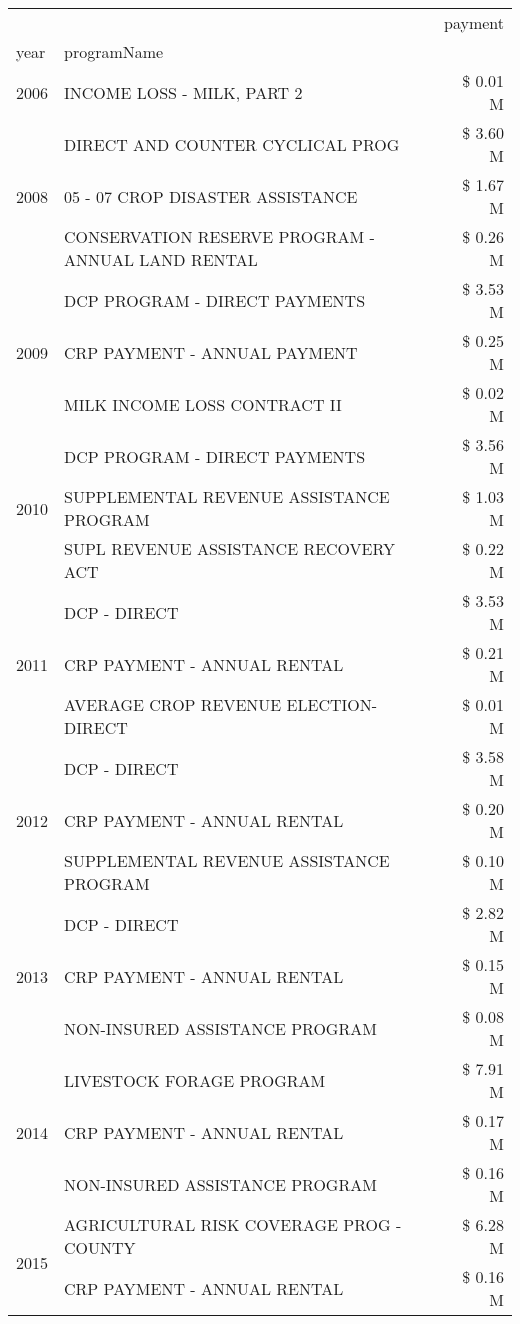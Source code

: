 \begin{tabular}{llr}
\toprule
 &  & payment \\
year & programName &  \\
\midrule
2006 & INCOME LOSS - MILK, PART 2 & \$ 0.01 M \\
\cline{1-3}
\multirow[t]{3}{*}{2008} & DIRECT AND COUNTER CYCLICAL PROG & \$ 3.60 M \\
 & 05 - 07 CROP DISASTER ASSISTANCE & \$ 1.67 M \\
 & CONSERVATION RESERVE PROGRAM - ANNUAL LAND RENTAL & \$ 0.26 M \\
\cline{1-3}
\multirow[t]{3}{*}{2009} & DCP PROGRAM - DIRECT PAYMENTS & \$ 3.53 M \\
 & CRP PAYMENT - ANNUAL PAYMENT & \$ 0.25 M \\
 & MILK INCOME LOSS CONTRACT II & \$ 0.02 M \\
\cline{1-3}
\multirow[t]{3}{*}{2010} & DCP PROGRAM - DIRECT PAYMENTS & \$ 3.56 M \\
 & SUPPLEMENTAL REVENUE ASSISTANCE PROGRAM & \$ 1.03 M \\
 & SUPL REVENUE ASSISTANCE RECOVERY ACT & \$ 0.22 M \\
\cline{1-3}
\multirow[t]{3}{*}{2011} & DCP - DIRECT & \$ 3.53 M \\
 & CRP PAYMENT - ANNUAL RENTAL & \$ 0.21 M \\
 & AVERAGE CROP REVENUE ELECTION-DIRECT & \$ 0.01 M \\
\cline{1-3}
\multirow[t]{3}{*}{2012} & DCP - DIRECT & \$ 3.58 M \\
 & CRP PAYMENT - ANNUAL RENTAL & \$ 0.20 M \\
 & SUPPLEMENTAL REVENUE ASSISTANCE PROGRAM & \$ 0.10 M \\
\cline{1-3}
\multirow[t]{3}{*}{2013} & DCP - DIRECT & \$ 2.82 M \\
 & CRP PAYMENT - ANNUAL RENTAL & \$ 0.15 M \\
 & NON-INSURED ASSISTANCE PROGRAM & \$ 0.08 M \\
\cline{1-3}
\multirow[t]{3}{*}{2014} & LIVESTOCK FORAGE PROGRAM & \$ 7.91 M \\
 & CRP PAYMENT - ANNUAL RENTAL & \$ 0.17 M \\
 & NON-INSURED ASSISTANCE PROGRAM & \$ 0.16 M \\
\cline{1-3}
\multirow[t]{3}{*}{2015} & AGRICULTURAL RISK COVERAGE PROG - COUNTY & \$ 6.28 M \\
 & CRP PAYMENT - ANNUAL RENTAL & \$ 0.16 M \\

\end{tabular}
